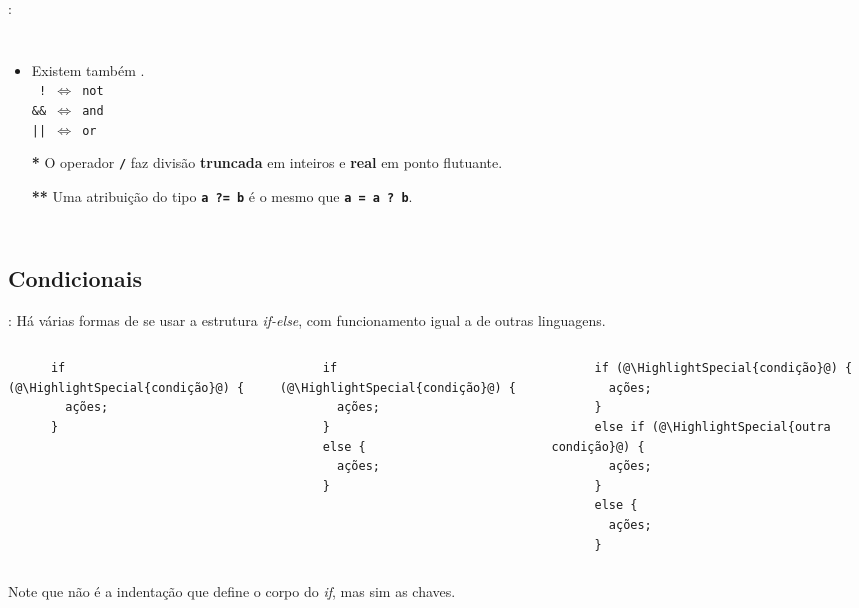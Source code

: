 \begin{frame}{\insertsection: \insertsubsection}
\begin{columns}[b]
    \begin{itemize}
    \item Existem também .\\
    \texttt{~!~$\Longleftrightarrow$~not}\\
    \texttt{\&\&~$\Longleftrightarrow$~and}\\
    \texttt{||~$\Longleftrightarrow$~or}\smallskip\\
    \item[\textbf{*}] O operador \textbf{\texttt{/}} faz divisão \textbf{truncada} em inteiros e \textbf{real} em ponto flutuante.
    \item[\textbf{**}] Uma atribuição do tipo \textbf{\texttt{a~?=~b}} é o mesmo que \textbf{\texttt{a~=~a~?~b}}.
    \end{itemize}
  \end{columns}
\end{frame}


\subsection{Condicionais}


\begin{frame}[fragile]{\insertsection: \insertsubsection}
  Há várias formas de se usar a estrutura \textit{if-else}, com funcionamento igual a de outras linguagens.
  \begin{columns}[t]
    \begin{verbatim}
      if (@\HighlightSpecial{condição}@) {
      	ações;
      }
    \end{verbatim}
    \begin{verbatim}
      if (@\HighlightSpecial{condição}@) {
      	ações;
      }
      else {
      	ações;
      }
    \end{verbatim}
    \begin{verbatim}
      if (@\HighlightSpecial{condição}@) {
      	ações;
      }
      else if (@\HighlightSpecial{outra condição}@) {
      	ações;
      }
      else {
      	ações;
      }
    \end{verbatim}
  \end{columns}
  Note que não é a indentação que define o corpo do \textit{if}, mas sim as chaves.
\end{frame}


